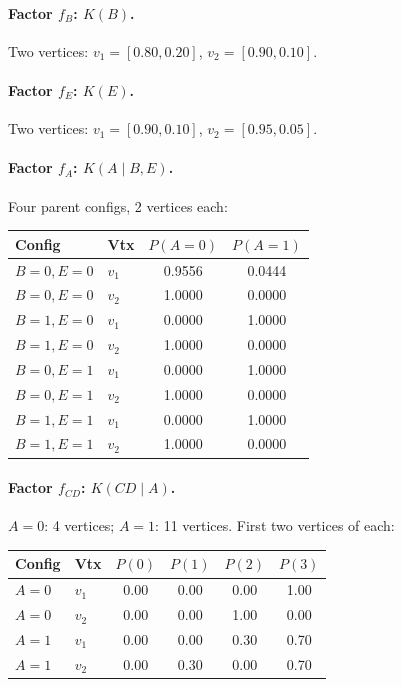 \documentclass[11pt]{article}
\begin{document}
\paragraph{Factor $f_B$: $K(B)$.} Two vertices: $v_1 = [0.80, 0.20]$, $v_2 = [0.90, 0.10]$.

\paragraph{Factor $f_E$: $K(E)$.} Two vertices: $v_1 = [0.90, 0.10]$, $v_2 = [0.95, 0.05]$.

\paragraph{Factor $f_A$: $K(A \mid B, E)$.} Four parent configs, 2 vertices each:
\begin{center}
\begin{tabular}{llcc}
\toprule
\textbf{Config} & \textbf{Vtx} & $P(A{=}0)$ & $P(A{=}1)$ \\
\midrule
$B{=}0, E{=}0$ & $v_1$ & 0.9556 & 0.0444 \\
$B{=}0, E{=}0$ & $v_2$ & 1.0000 & 0.0000 \\
\midrule
$B{=}1, E{=}0$ & $v_1$ & 0.0000 & 1.0000 \\
$B{=}1, E{=}0$ & $v_2$ & 1.0000 & 0.0000 \\
\midrule
$B{=}0, E{=}1$ & $v_1$ & 0.0000 & 1.0000 \\
$B{=}0, E{=}1$ & $v_2$ & 1.0000 & 0.0000 \\
\midrule
$B{=}1, E{=}1$ & $v_1$ & 0.0000 & 1.0000 \\
$B{=}1, E{=}1$ & $v_2$ & 1.0000 & 0.0000 \\
\bottomrule
\end{tabular}
\end{center}

\paragraph{Factor $f_{CD}$: $K(CD \mid A)$.} $A{=}0$: 4 vertices; $A{=}1$: 11 vertices.
First two vertices of each:
\begin{center}
\begin{tabular}{llcccc}
\toprule
\textbf{Config} & \textbf{Vtx} & $P(0)$ & $P(1)$ & $P(2)$ & $P(3)$ \\
\midrule
$A{=}0$ & $v_1$ & 0.00 & 0.00 & 0.00 & 1.00 \\
$A{=}0$ & $v_2$ & 0.00 & 0.00 & 1.00 & 0.00 \\
\midrule
$A{=}1$ & $v_1$ & 0.00 & 0.00 & 0.30 & 0.70 \\
$A{=}1$ & $v_2$ & 0.00 & 0.30 & 0.00 & 0.70 \\
\bottomrule
\end{tabular}
\end{center}
\end{document}
